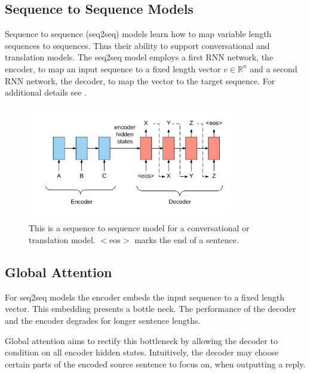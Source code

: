 \documentclass[%
 reprint,
 amsmath,amssymb,
 aps,
]{revtex4-1}
\begin{document}
\subsection{\label{sec:level2}Sequence to Sequence Models} \label{seq2seq}

Sequence to sequence (seq2seq) models learn how to map variable length sequences to sequences. Thus their ability to support conversational and translation models. The seq2seq model employs a first RNN network, the encoder, to map an input sequence to a fixed length vector $v \in \mathbb{R}^{n}$ and a second RNN network, the decoder, to map the vector to the target sequence. For additional details see \cite{seq2seq}.

\begin{figure}
  \includegraphics[width=9cm, height=5cm, keepaspectratio]{NLU_seq2seq.png}
  \caption{This is a sequence to sequence model for a conversational or translation model. $<$eos$>$ marks the end of a sentence.}
\end{figure}




\subsection{\label{sec:level2}Global Attention} \label{globalattention}
For seq2seq models the encoder embeds the input sequence to a fixed length vector. This embedding presents a bottle neck. The performance of the decoder and the encoder degrades for longer sentence lengths.

Global attention aims to rectify this bottleneck by allowing the decoder to condition on all encoder hidden states. Intuitively, the decoder may choose certain parts of the encoded source sentence to focus on, when outputting a reply. 
\end{document}
